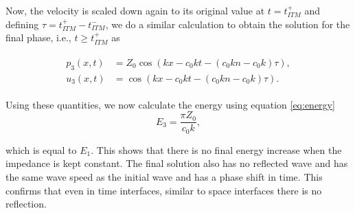 Now, the velocity is scaled down again to its original value at $t=t_{ITM}^+$ and defining $\tau = t_{ITM}^+ - t_{ITM}^-$, we do a similar calculation to obtain the solution for the final phase, i.e., $t \geq t_{ITM}^+$ as

\begin{align}
    \begin{split}
        p_3\left(x, t\right) & = Z_{0} \cos\left(kx - c_{0} k t - {\left(c_{0} k n - c_{0} k\right)} \tau\right) , \\
        u_3\left(x, t\right) & =  \cos\left(kx - c_{0} k t - {\left(c_{0} k n - c_{0} k\right)} \tau\right) . 
    \end{split}
\end{align}

Using these quantities, we now calculate the energy using equation \ref{eq:energy}
\begin{equation}
    E_3 = \frac{\pi Z_0}{c_0 k} ,
\end{equation}

which is equal to $E_1$. This shows that there is no final energy increase when the impedance is kept constant. The final solution also has no reflected wave and has the same wave speed as the initial wave and has a phase shift in time. This confirms that even in time interfaces, similar to space interfaces there is no reflection.


